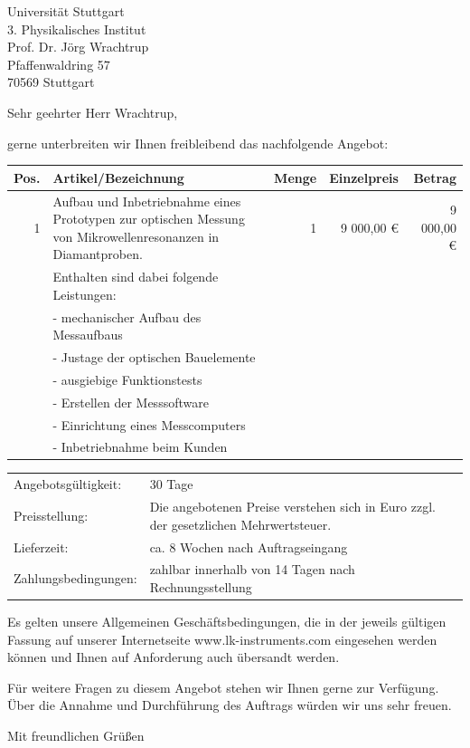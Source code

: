 \documentclass[DIN,
               paper=a4,
               fontsize=11pt,
               enlargefirstpage,
               foldmarks=on,
               pagenumber=off,
               firsthead=on,
               firstfoot=on,
               parskip=full,
               addrfield=on,
               fromalign=right,
               fromemail=true,
               fromphone=true,
               fromurl=true,
               fromlogo=on,
               fromrule=off,
               numericaldate=off,
              ]{scrlttr2}
\begin{document}
\begin{letter}{Universität Stuttgart\\
               3. Physikalisches Institut\\
               Prof. Dr. Jörg Wrachtrup\\               
               Pfaffenwaldring 57\\
               70569 Stuttgart}
               
\opening{Sehr geehrter Herr Wrachtrup,}
gerne unterbreiten wir Ihnen freibleibend das nachfolgende Angebot:


{\small
\begin{tabular}{|r|p{7.5cm}|r|r|r|}
\hline 
\textbf{Pos.} & \textbf{Artikel/Bezeichnung} & \textbf{Menge} & \textbf{Einzelpreis} & \textbf{Betrag} \\ 
\hline 
1 & Aufbau und Inbetriebnahme eines Prototypen zur optischen Messung
von Mikrowellenresonanzen in Diamantproben. & 1 & 9 000,00 € & 9 000,00 € \\
 & Enthalten sind dabei folgende Leistungen: & & & \\
 & - mechanischer Aufbau des Messaufbaus & & & \\
 & - Justage der optischen Bauelemente & & & \\
 & - ausgiebige Funktionstests & & & \\
 & - Erstellen der Messsoftware & & & \\
 & - Einrichtung eines Messcomputers & & & \\
 & - Inbetriebnahme beim Kunden & & & \\
\hline 
\end{tabular}
} 

\begin{tabularx}{\textwidth}{@{}lX}
Angebotsgültigkeit: & 30 Tage\\
Preisstellung: & Die angebotenen Preise verstehen sich in Euro zzgl. der gesetzlichen Mehrwertsteuer.\\
Lieferzeit: & ca. 8 Wochen nach Auftragseingang\\
Zahlungsbedingungen: & zahlbar innerhalb von 14 Tagen nach Rechnungsstellung
\end{tabularx}

Es gelten unsere Allgemeinen Geschäftsbedingungen, die in der jeweils gültigen Fassung auf unserer Internetseite www.lk-instruments.com eingesehen werden können und Ihnen auf Anforderung auch übersandt werden.

Für weitere Fragen zu diesem Angebot stehen wir Ihnen gerne zur Verfügung.
Über die Annahme und Durchführung des Auftrags würden wir uns sehr freuen.
\closing{Mit freundlichen Grüßen}


\end{letter}
\end{document}
